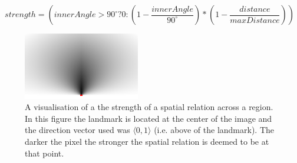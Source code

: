 
\begin{equation}
strength = (innerAngle > 90^{\circ}? 0 : (1- \frac{innerAngle}{90^{\circ}}) * (1- \frac{distance}{maxDistance}))
\label{eq:spatial}
\end{equation}



\begin{figure}
\centerline{
\includegraphics[width=2in]{./images/spatialRelations/xZeroYOne.png}
}
\caption{A visualisation of a the strength of a spatial relation across a region. In this figure the landmark is located at the center of the image and the direction vector used was $\langle0,1\rangle$ (i.e. above of the landmark). The darker the pixel the stronger the spatial relation is deemed to be at that point.}
\label{fig:spr}
\end{figure}

